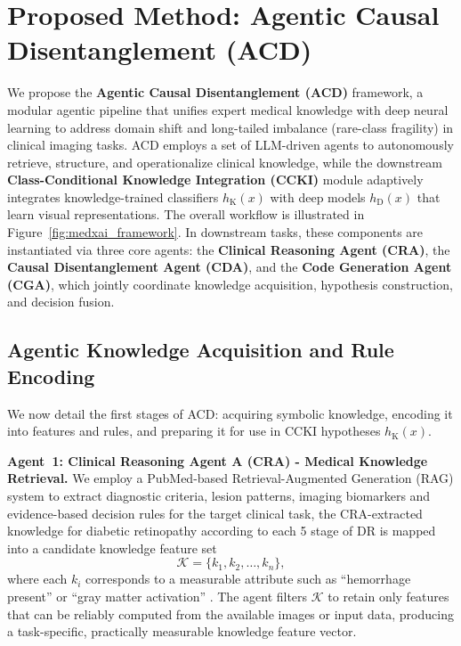 \documentclass[runningheads]{llncs}
\begin{document}
\section{Proposed Method: Agentic Causal Disentanglement (ACD)}
We propose the \textbf{Agentic Causal Disentanglement (ACD)} framework, a modular agentic pipeline that unifies expert medical knowledge with deep neural learning to address domain shift and long-tailed imbalance (rare-class fragility) in clinical imaging tasks. ACD employs a set of LLM-driven agents to autonomously retrieve, structure, and operationalize clinical knowledge, while the downstream \textbf{Class-Conditional Knowledge Integration (CCKI)} module adaptively integrates knowledge-trained classifiers $h_{\mathrm{K}}(x)$ with deep models $h_{\mathrm{D}}(x)$ that learn visual representations. The overall workflow is illustrated in Figure~\ref{fig:medxai_framework}. 
In downstream tasks, these components are instantiated via three core agents: the \textbf{Clinical Reasoning Agent (CRA)}, the \textbf{Causal Disentanglement Agent (CDA)}, and the \textbf{Code Generation Agent (CGA)}, which jointly coordinate knowledge acquisition, hypothesis construction, and decision fusion. 
%           
\subsection{Agentic Knowledge Acquisition and Rule Encoding}
%           

We now detail the first stages of ACD: acquiring symbolic knowledge, encoding it into features and rules, and preparing it for use in CCKI hypotheses $h_{\mathrm{K}}(x)$.

\textbf{Agent~1: Clinical Reasoning Agent A
(CRA) - Medical Knowledge Retrieval.}
We employ a PubMed-based Retrieval-Augmented Generation (RAG) system to extract diagnostic criteria, lesion patterns, imaging biomarkers and evidence-based decision rules for the target clinical task, the CRA-extracted knowledge for diabetic retinopathy according to each  5 stage of DR is mapped into a candidate knowledge feature set
\[
\mathcal{K} = \{k_1, k_2, \dots, k_n\},
\]
where each $k_i$ corresponds to a measurable attribute such as ``hemorrhage present'' or ``gray matter activation'' . The agent filters $\mathcal{K}$ to retain only features that can be reliably computed from the available images or input data, producing a task-specific, practically measurable knowledge feature vector.
\end{document}
